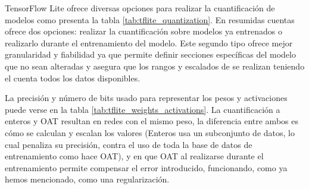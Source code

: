 TensorFlow Lite ofrece diversas opciones para realizar la cuantificación de modelos como presenta la tabla \ref{tab:tflite_quantization}. En resumidas cuentas ofrece dos opciones: realizar la cuantificación sobre modelos ya entrenados o realizarlo durante el entrenamiento del modelo. Este segundo tipo ofrece mejor granularidad y fiabilidad ya que permite definir secciones específicas del modelo que no sean alteradas y asegura que los rangos y escalados de se realizan teniendo el cuenta todos los datos disponibles.



La precisión y número de bits usado para representar los pesos y activaciones puede verse en la tabla \ref{tab:tflite_weights_activations}. La cuantificación a enteros y OAT resultan en redes con el mismo peso, la diferencia entre ambos es cómo se calculan y escalan los valores (Enteros usa un subconjunto de datos, lo cual penaliza su precisión, contra el uso de toda la base de datos de entrenamiento como hace OAT), y en que OAT al realizarse durante el entrenamiento permite compensar el error introducido, funcionando, como ya hemos mencionado, como una regularización.


